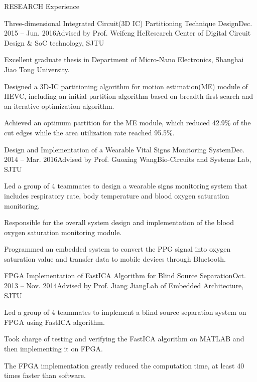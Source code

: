 \documentclass{resume_ucla} %
\begin{document}
\begin{rSection}{RESEARCH Experience}
\begin{rSubsection}{Three-dimensional Integrated Circuit(3D IC) Partitioning Technique Design}{Dec. 2015 -- Jun. 2016}{Advised by Prof. Weifeng He}{Research Center of Digital Circuit Design \& SoC technology, SJTU}
\item Excellent graduate thesis in Department of Micro-Nano Electronics, Shanghai Jiao Tong University.
\item Designed a 3D-IC partitioning algorithm for motion estimation(ME) module of HEVC, including an initial partition algorithm based on breadth first search and an iterative optimization algorithm.
\item Achieved an optimum partition for the ME module, which reduced 42.9\% of the cut edges while the area utilization rate reached 95.5\%.
\end{rSubsection}

\begin{rSubsection}{Design and Implementation of a Wearable Vital Signs Monitoring System}{Dec. 2014 -- Mar. 2016}{Advised by Prof. Guoxing Wang}{Bio-Circuits and Systems Lab, SJTU}
\item Led a group of 4 teammates to design a wearable signs monitoring system that includes respiratory rate, body temperature and blood oxygen saturation monitoring. 
\item Responsible for the overall system design and implementation of the blood oxygen saturation monitoring module.
\item Programmed an embedded system to convert the PPG signal into oxygen saturation value and transfer data to mobile devices through Bluetooth.
\end{rSubsection}

\begin{rSubsection}{FPGA Implementation of FastICA Algorithm for Blind Source Separation}{Oct. 2013 -- Nov. 2014}{Advised by Prof. Jiang Jiang}{Lab of Embedded Architecture, SJTU}
\item Led a group of 4 teammates to implement a blind source separation system on FPGA using FastICA algorithm.
\item Took charge of testing and verifying the FastICA algorithm on MATLAB and then implementing it on FPGA. 
\item The FPGA implementation greatly reduced the computation time, at least 40 times faster than software.
\end{rSubsection}

\end{rSection}
\end{document}

